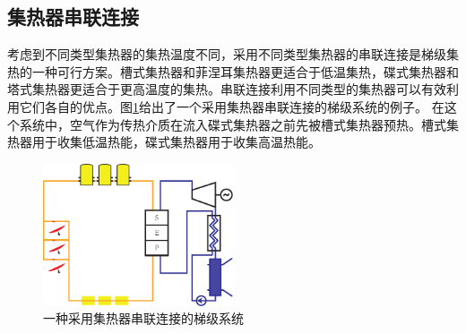 \subsection{集热器串联连接}
\label{sec:csc}

考虑到不同类型集热器的集热温度不同，采用不同类型集热器的串联连接是梯级集热的一种可行方案。槽式集热器和菲涅耳集热器更适合于低温集热，碟式集热器和塔式集热器更适合于更高温度的集热。串联连接利用不同类型的集热器可以有效利用它们各自的优点。图\ref{fig:SeriesCollector}给出了一个采用集热器串联连接的梯级系统的例子。 在这个系统中，空气作为传热介质在流入碟式集热器之前先被槽式集热器预热。槽式集热器用于收集低温热能，碟式集热器用于收集高温热能。

\begin{figure}[!ht]
\centering 
\includegraphics[width=0.5\textwidth]{fig/SeriesCollector}
\caption{一种采用集热器串联连接的梯级系统}\label{fig:SeriesCollector}
\end{figure}

